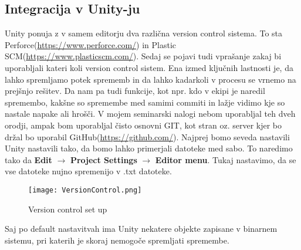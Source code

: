 {\color{indiagreen}\subsection{Integracija v Unity-ju}}
Unity ponuja z v samem editorju dva različna version control sistema. To sta Perforce(\url{https://www.perforce.com/}) in Plastic SCM(\url{https://www.plasticscm.com/}). Sedaj se pojavi tudi vprašanje zakaj bi uporabljali kateri koli version control sistem. Ena izmed ključnih lastnosti je, da lahko spremljamo potek sprememb in da lahko kadarkoli v procesu se vrnemo na prejšnjo rešitev. Da nam pa tudi funkcije, kot npr. kdo v ekipi je naredil spremembo, kakšne so spremembe med samimi commiti in lažje vidimo kje so nastale napake ali hrošči. 
V mojem seminarski nalogi nebom uporabljal teh dveh orodji, ampak bom uporabljal čisto osnovni GIT, kot stran oz. server kjer bo držal bo uporabil GitHub(\url{https://github.com/}). 
Najprej bomo seveda nastavili Unity nastavili tako, da bomo lahko primerjali datoteke med sabo. To naredimo tako da \textbf{Edit} $\rightarrow$ \textbf{Project Settings} $\rightarrow$ \textbf{Editor menu}. Tukaj nastavimo, da se vse datoteke nujno spremenijo v .txt datoteke.\\
\begin{figure}[ht!]
	\centering
	\texttt{[image: VersionControl.png]}
	\caption{Version control set up}
\end{figure}
Saj po default nastavitvah ima Unity nekatere objekte zapisane v binarnem sistemu, pri katerih je skoraj nemogoče spremljati spremembe.
